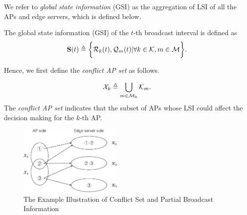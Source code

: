 We refer to \emph{global state information} (GSI) as the aggregation of LSI of all the APs and edge servers, which is defined below.
\begin{definition}
    The global state information (GSI) of the $t$-th broadcast interval is defined as
    \begin{align}
        \mathbf{S}(t) \triangleq
            \bigg\{
                \mathcal{R}_{k}(t), \mathcal{Q}_{m}(t) | \forall k\in\mathcal{K}, m\in\mathcal{M}
            \bigg\}.
    \end{align}
\end{definition}


Hence, we first define the \emph{conflict AP set} as follows.
\begin{definition}
    \begin{align}
        \mathcal{X}_{k} \triangleq \bigcup_{m\in\mathcal{M}_{k}} \mathcal{K}_{m}.
    \end{align}
    The \emph{conflict AP set} indicates that the subset of APs whose LSI could affect the decision making for the $k$-th AP.
\end{definition}

\begin{figure}[tp]
    \centering
    \includegraphics[width=0.45\textwidth]{images/conflict.pdf}
    \caption{The Example Illustration of Conflict Set and Partial Broadcast Information}
    \label{fig:conflict}
\end{figure}

